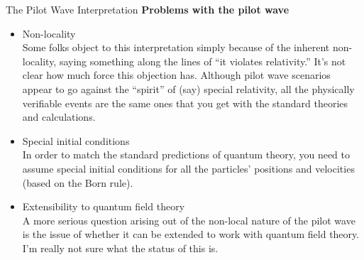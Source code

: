 \documentclass[9pt,usenames,dvipsnames]{beamer}
\begin{document}
\begin{frame}[t]{The Pilot Wave Interpretation}
\vspace{0pt}
{\bf Problems with the pilot wave}
\begin{itemize}
\vspace{6pt}
\item Non-locality
\vspace{6pt}\\
    Some folks object to this interpretation simply because of the inherent
    non-locality, saying something along the lines of 
    ``it violates relativity.'' It's not clear how much force this objection
    has. Although pilot wave scenarios appear to go against the ``spirit''
    of (say) special relativity, all the physically verifiable events are the
    same ones that you get with the standard theories and calculations.
\vspace{6pt}
\item Special initial conditions
    \vspace{6pt}\\
    In order to match the standard predictions of quantum theory, you need
    to assume special initial conditions for all the particles' positions
    and velocities (based on the Born rule).
\vspace{6pt}
\item Extensibility to quantum field theory
    \vspace{6pt}\\
    A more serious question arising out of the non-local nature of the
    pilot wave is the issue of whether it can be extended to work with
    quantum field theory. I'm really not sure what the status of this is.

\end{itemize}
\end{frame}
\end{document}
